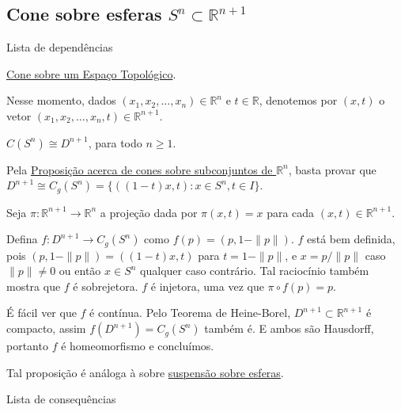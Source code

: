 \subsection{Cone sobre esferas $S^n\subset\mathbb{R}^{n+1}$}
\label{cone-esfera-prop}
\begin{titlemize}{Lista de dependências}
	\item \hyperref[cone-def]{Cone sobre um Espaço Topológico}.
\end{titlemize}

Nesse momento, dados $(x_1,x_2,...,x_n) \in \mathbb{R}^n$ e $t \in \mathbb{R}$, denotemos por $(x,t)$ o vetor $(x_1,x_2,...,x_n,t) \in \mathbb{R}^{n+1}$.

\begin{prop}
	$C(S^n) \cong D^{n+1}$, para todo $n\geq 1$.
 
    \begin{dem}
        Pela \hyperref[cone-euclidiano-prop]{Proposição acerca de cones sobre subconjuntos de $\mathbb{R}^n$}, basta provar que $D^{n+1}\cong C_g(S^n) = \{((1-t)x,t):x\in S^n, t\in I\}$.

        Seja $\pi:\mathbb{R}^{n+1}\to\mathbb{R}^n$ a projeção dada por $\pi(x,t) = x$ para cada $(x,t) \in \mathbb{R}^{n+1}$.
        
        Defina $f:D^{n+1}\to C_g(S^n)$ como $f(p) = (p,1-\|p\|)$. $f$ está bem definida, pois $(p,1-\|p\|)=((1-t)x,t)$ para $t=1-\|p\|$, e $x=p/\|p\|$ caso $\|p\|\neq 0$ ou então $x\in S^n$ qualquer caso contrário. Tal raciocínio também mostra que $f$ é sobrejetora. $f$ é injetora, uma vez que $\pi \circ f(p) = p$.

        É fácil ver que $f$ é contínua.  Pelo Teorema de Heine-Borel, $D^{n+1} \subset \mathbb{R}^{n+1}$ é compacto, assim $f(D^{n+1})=C_g(S^n)$ também é. E ambos são Hausdorff, portanto $f$ é homeomorfismo e concluímos. 
    \end{dem}
\end{prop}

Tal proposição é análoga à sobre \hyperref[suspensao-esfera-prop]{suspensão sobre esferas}.

\begin{titlemize}{Lista de consequências}
\end{titlemize}